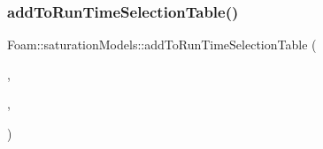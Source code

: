 \mbox{\label{namespaceFoam_1_1saturationModels_af8c4d000d19a1a66e1e1a769e7620b66}} 
\subsubsection{\texorpdfstring{add\+To\+Run\+Time\+Selection\+Table()}{addToRunTimeSelectionTable()}\hspace{0.1cm}{\footnotesize\ttfamily [4/4]}}
{\footnotesize\ttfamily Foam\+::saturation\+Models\+::add\+To\+Run\+Time\+Selection\+Table (\begin{DoxyParamCaption}\item[{\hyperlink{classFoam_1_1saturationModel}{saturation\+Model}}]{,  }\item[{\hyperlink{classFoam_1_1saturationModels_1_1waterTRACE}{water\+T\+R\+A\+CE}}]{,  }\item[{saturation\+Models}]{ }\end{DoxyParamCaption})}

